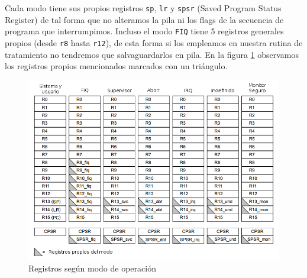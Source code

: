 Cada modo tiene sus propios registros {\tt sp}, {\tt lr} y {\tt spsr}
(Saved Program Status Register) de tal
forma que no alteramos la pila ni los flags de la secuencia de programa que interrumpimos. Incluso
el modo {\tt FIQ} tiene 5 registros generales propios (desde {\tt r8} hasta {\tt r12}),
de esta forma si los empleamos en nuestra rutina de tratamiento no tendremos que
salvaguardarlos en pila. En la figura \ref{fig:tablareg} observamos los registros propios
mencionados marcados con un triángulo.

\begin{figure}[h]
  \centering
    \includegraphics[width=14cm]{graphs/tablaregistros.png}
  \caption{Registros según modo de operación}
  \label{fig:tablareg}
\end{figure}

